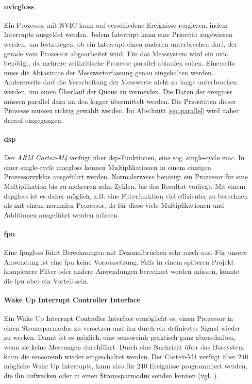 \paragraph{\gls{nvicgloss}} Ein Prozessor mit NVIC kann auf verschiedene Ereignisse reagieren, indem Interrupts ausgelöst werden. Jedem Interrupt kann eine Priorität zugewiesen werden, um festzulegen, ob ein Interrupt einen anderen unterbrechen darf, der gerade vom Prozessor abgearbeitet wird. Für das Messsystem wird ein \gls{nvic} benötigt, da mehrere zeitkritische Prozesse parallel ablaufen sollen. Einerseits muss die Abtastrate der Messwerterfassung genau eingehalten werden. Andererseits darf die Verarbeitung der Messwerte nicht zu lange unterbrochen werden, um einen Überlauf der Queue zu vermeiden. Die Daten der \glspl{ereignis} müssen parallel dazu an den \gls{logger} übermittelt werden. Die Prioritäten dieser Prozesse müssen richtig gewählt werden. Im Abschnitt \ref{sec.parallel} wird näher darauf eingegangen.

\paragraph{\gls{dsp}} Der \emph{ARM Cortex-M4} verfügt über \gls{dsp}-Funktionen, eine sog. single-cycle \gls{mac}. In einer single-cycle \gls{macgloss} können Multiplikationen in einem einzigen Prozessorzyklus ausgeführt werden. Normalerweise benötigt ein Prozessor für eine Multiplikation bis zu mehreren zehn Zyklen, bis das Resultat vorliegt. Mit einem \gls{dspgloss} ist es daher möglich, z.B. eine Filterfunktion viel effizienter zu berechnen als mit einem normalen Prozessor, da für diese viele Multiplikationen und Additionen ausgeführt werden müssen.

\paragraph{\gls{fpu}} Eine \gls{fpugloss} führt Berechnungen mit Dezimalbrüchen sehr rasch aus. Für unsere Anwendung ist eine \gls{fpu} keine Voraussetzung. Falls in einem späteren Projekt komplexere Filter oder andere Anwendungen berechnet werden müssen, könnte die \gls{fpu} aber ein Vorteil sein.

\paragraph{Wake Up Interrupt Controller Interface} Ein Wake Up Interrupt Controller Interface ermöglicht es, einen Prozessor in einen Stromsparmodus zu versetzen und ihn durch ein definiertes Signal wieder zu wecken. Damit ist es möglich, eine \gls{sensoreinh} praktisch ganz abzuschalten, wenn sie keine Messungen durchführt. Durch eine Nachricht über das Bussystem kann die \gls{sensoreinh} wieder eingeschaltet werden. Der Cortex-M4 verfügt über 240 mögliche Wake Up Interrupts, kann also für 240 Ereignisse programmiert werden, die ihn aufwecken oder in einen Stromsparmodus senden können (vgl. \cite{armcortex}).


